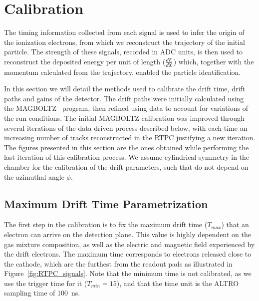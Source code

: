 \documentclass[preprint,5p]{elsarticle}
\begin{document}
\section{Calibration} \label{sec_calib}

The timing information collected from each signal is used 
to infer the origin of the ionization electrons, from which we
reconstruct the trajectory of the initial particle. The strength of these 
signals, recorded in ADC units, is then used to reconstruct 
the deposited energy per unit of length ($\small{\frac{dE}{dX}}$) which, 
together with the momentum calculated from the trajectory, enabled the particle 
identification. 

In this section we will detail the methods used to calibrate the drift time,
drift paths and gains of the detector. The drift paths were initially
calculated using the MAGBOLTZ~\cite{Biagi:1999nwa} program, then refined using
data to account for variations of the run conditions. The initial MAGBOLTZ
calibration was improved through several iterations of the
data driven process described below, with each time an increasing number of tracks 
reconstructed in the RTPC justifying a new iteration. The figures presented in this section
are the ones obtained while performing the last iteration of this
calibration process. We assume 
cylindrical symmetry in the chamber for the calibration of the drift parameters, 
such that do not depend on the azimuthal angle $\phi$.

\subsection{Maximum Drift Time Parametrization}

The first step in the calibration is to fix the maximum drift time ($T_{max}$) that an
electron can arrive on the detection plane. This value is highly dependent on the gas 
mixture composition, as well as the electric and magnetic field experienced by the drift 
electrons. The maximum time corresponds to electrons released close to 
the cathode, which are the furthest from the readout pads as illustrated in 
Figure~\ref{fig:RTPC_signals}. Note that the minimum time is not calibrated, as we
use the trigger time for it ($T_{min}=15$), and that the time unit is the ALTRO 
sampling time of 100~ns.
\end{document}
